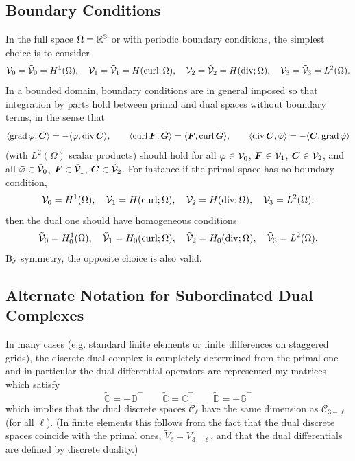\documentclass[11pt]{article}
\begin{document}
\subsection{Boundary Conditions}
\label{sec:boundary_conditions}

In the full space $\Omega = \mathbb{R}^3$ or with periodic boundary conditions,
the simplest choice is to consider 
\begin{equation} \label{eq:dR_spaces_nobound}
  \mathcal{V}_0 = \tilde{\mathcal{V}}_0 = H^1(\Omega), \quad
    \mathcal{V}_1 = \tilde{\mathcal{V}}_1 = H(\operatorname{curl};\Omega), \quad
      \mathcal{V}_2 = \tilde{\mathcal{V}}_2 = H(\operatorname{div};\Omega), \quad
        \mathcal{V}_3 = \tilde{\mathcal{V}}_3 = L^2(\Omega).
\end{equation}		
In a bounded domain, boundary conditions are in general imposed
so that integration by parts hold between primal and dual spaces without boundary terms,
in the sense that
$$
\langle\operatorname{grad} {\varphi},\tilde {{\boldsymbol C}}\rangle = -\langle{\varphi},\operatorname{div} \tilde {{\boldsymbol C}}\rangle,
\qquad
\langle\operatorname{curl} {\boldsymbol F},\tilde {{\boldsymbol G}}\rangle = \langle{\boldsymbol F},\operatorname{curl} \tilde {{\boldsymbol G}}\rangle,
\qquad
\langle\operatorname{div} {\boldsymbol C},\tilde {{\varphi}}\rangle = -\langle{\boldsymbol C},\operatorname{grad} \tilde {{\varphi}}\rangle
$$
(with $L^2(\Omega)$ scalar products) 
should hold for all ${\varphi} \in \mathcal{V}_0$, ${\boldsymbol F} \in \mathcal{V}_1$, ${\boldsymbol C} \in \mathcal{V}_2$,
and all $\tilde {{\varphi}} \in \tilde{\mathcal{V}}_0$, $\tilde {{\boldsymbol F}} \in \tilde{\mathcal{V}}_1$,
$\tilde {{\boldsymbol C}} \in \tilde{\mathcal{V}}_2$.
For instance if the primal space has no boundary condition,
\begin{equation} \label{eq:dR_spaces_inhom}
	\mathcal{V}_0 = H^1(\Omega), \quad
    \mathcal{V}_1 = H(\operatorname{curl};\Omega), \quad
      \mathcal{V}_2 = H(\operatorname{div};\Omega), \quad
        \mathcal{V}_3 = L^2(\Omega).
\end{equation}		
then the dual one should have homogeneous conditions
\begin{equation} \label{eq:dR_spaces_hom}
	\tilde{\mathcal{V}}_0 = H^1_0(\Omega), \quad
    \tilde{\mathcal{V}}_1 = H_0(\operatorname{curl};\Omega), \quad
      \tilde{\mathcal{V}}_2 = H_0(\operatorname{div};\Omega), \quad
        \tilde{\mathcal{V}}_3 = L^2(\Omega).
\end{equation}		
By symmetry, the opposite choice is also valid.


\subsection{Alternate Notation for Subordinated Dual Complexes}

In many cases (e.g. standard finite elements or finite differences on staggered grids), the discrete dual complex is completely determined from the primal one and in particular the dual differential operators are represented my matrices which satisfy
\begin{equation} \label{eq:diff_T}
	\tilde{\mathbb{G}} = -\mathbb{D}^\top
	\qquad 
	\tilde{\mathbb{C}} = \mathbb{C}^\top
	\qquad
	\tilde{\mathbb{D}} = -\mathbb{G}^\top
\end{equation}
which implies that the dual discrete spaces $\tilde{\mathcal{C}}_\ell$ have the same dimension as $\mathcal{C}_{3-\ell}$
(for all $\ell$). 
(In finite elements this follows from the fact that the dual discrete spaces coincide with the 
primal ones, $\tilde{V}_\ell = V_{3-\ell}$, and that the dual differentials are defined by discrete duality.)
\end{document}
